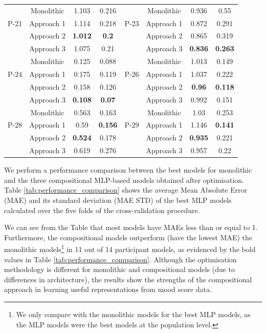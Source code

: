 \begin{table}[htbp]
\begin{tabular}{cccccccc}
 \hline
 \multirow{3}{*}{P-21}  & Monolithic & 1.103 & 0.216 & 
 \multirow{3}{*}{P-23}  & Monolithic & 0.936 & 0.55  \\
 & Approach 1 & 1.114 & 0.218 &
 & Approach 1 & 0.872 & 0.291  \\
 & Approach 2 & \textbf{1.012} & \textbf{0.2} & 
 & Approach 2 & 0.865 & 0.319 \\
 & Approach 3 & 1.075 & 0.21 & 
 & Approach 3 & \textbf{0.836} &\textbf{ 0.263} \\
 \hline
 \multirow{3}{*}{P-24}  & Monolithic & 0.125 & 0.088 & 
 \multirow{3}{*}{P-26}  & Monolithic & 1.013 & 0.149  \\
 & Approach 1 & 0.175 & 0.119 &
 & Approach 1 & 1.037 & 0.222  \\
 & Approach 2 & 0.158 & 0.126 & 
 & Approach 2 &\textbf{ 0.96} & \textbf{0.118} \\
 & Approach 3 & \textbf{0.108} & \textbf{0.07} & 
 & Approach 3 & 0.992 & 0.151 \\
 \hline
 \multirow{3}{*}{P-28}  & Monolithic & 0.563 & 0.163 &
 \multirow{3}{*}{P-29}   & Monolithic & 1.03 & 0.253 \\
 & Approach 1 & 0.59 & \textbf{0.156}  & 
 & Approach 1 & 1.146 & \textbf{0.141} \\
 & Approach 2 & \textbf{0.524} & 0.178 & 
 & Approach 2 & \textbf{0.935} & 0.221 \\
 & Approach 3 & 0.619 & 0.276 & 
 & Approach 3 & 0.957 & 0.22 \\
 \hline

\end{tabular}
\label{tab:overall_res1}
\end{table}


We perform a performance comparison between the best models for monolithic and the three compositional MLP-based models obtained after optimisation. Table \ref{tab:performance_comparison} shows the average Mean Absolute Error (MAE) and its standard deviation (MAE STD) of the best MLP models calculated over the five folds of the cross-validation procedure.


We can see from the Table that most models have MAEs less than or equal to 1. Furthermore, the compositional models outperform (have the lowest MAE) the monolithic models\footnote{We only compare with the monolithic models for the best MLP models, as the MLP models were the best models at the population level.} in 11 out of 14 participant models, as evidenced by the bold values in Table \ref{tab:performance_comparison}. Although the optimisation methodology is different for monolithic and compositional models (due to differences in architecture), the results show the strengths of the compositional approach in learning useful representations from mood score data. 

